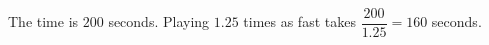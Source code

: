 The time is $200$ seconds. Playing $1.25$ times as fast takes $\dfrac{200}{1.25}=\boxed{160}$ seconds.
